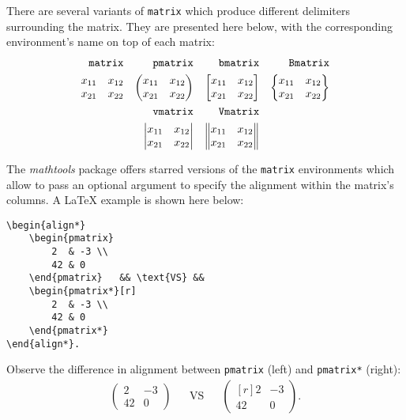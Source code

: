 	
	There are several variants of \texttt{matrix} which produce different delimiters surrounding the matrix.
	They are presented here below, with the corresponding environment's name on top of each matrix:
	\begin{align*}
		\text{\texttt{matrix}} && \text{\texttt{pmatrix}} && \text{\texttt{bmatrix}} && \text{\texttt{Bmatrix}} \\
		\begin{matrix}
			x_{11} & x_{12} \\
			x_{21} & x_{22}
		\end{matrix} 
		&&
		\begin{pmatrix}
			x_{11} & x_{12} \\
			x_{21} & x_{22}
		\end{pmatrix}
		&&
		\begin{bmatrix}
			x_{11} & x_{12} \\
			x_{21} & x_{22}
		\end{bmatrix}
		&&
		\begin{Bmatrix}
			x_{11} & x_{12} \\
			x_{21} & x_{22}
		\end{Bmatrix} \\
		&& \text{\texttt{vmatrix}} && \text{\texttt{Vmatrix}} && \\
		&&
		\begin{vmatrix}
			x_{11} & x_{12} \\
			x_{21} & x_{22}
		\end{vmatrix}
		&&
		\begin{Vmatrix}
			x_{11} & x_{12} \\
			x_{21} & x_{22}
		\end{Vmatrix}
		&& 
	\end{align*}
	
	
	The \emph{mathtools} package offers starred versions of the \texttt{matrix} environments which allow to pass an optional argument to specify the alignment within the matrix's columns.
	A \LaTeX{} example is shown here below:
\begin{lstlisting}[language={[LaTeX]TeX}]
\begin{align*}
	\begin{pmatrix}
		2  & -3 \\
		42 & 0
	\end{pmatrix}	&& \text{VS} &&
	\begin{pmatrix*}[r]
		2  & -3 \\
		42 & 0
	\end{pmatrix*}
\end{align*}.
\end{lstlisting}
	Observe the difference in alignment between \texttt{pmatrix} (left) and \texttt{pmatrix*} (right):
	\begin{align*}
		\begin{pmatrix}
		2  & -3 \\
		42 & 0
		\end{pmatrix}	&& \text{VS} &&
		\begin{pmatrix*}[r]
		2  & -3 \\
		42 & 0
		\end{pmatrix*}.
	\end{align*}



